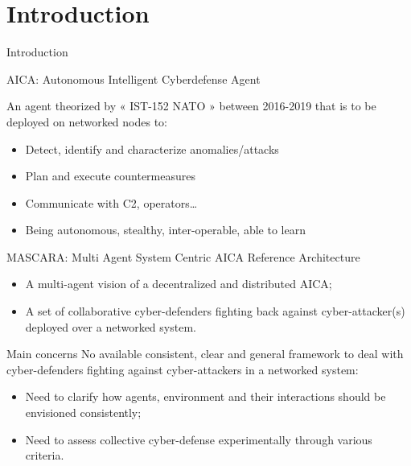 \AtBeginSection[]{
	\begin{frame}
		\frametitle{}
		\tableofcontents[currentsection]
	\end{frame}
}


	\section{Introduction}
	\begin{frame}[allowframebreaks]{Introduction}

	   \begin{block}{AICA: Autonomous Intelligent Cyberdefense Agent \cite{theron_autonomous_2021}}

            An agent theorized by « IST-152 NATO » between 2016-2019 that is to be deployed on networked nodes to:
 
	       \begin{itemize}
                \item Detect, identify and characterize anomalies/attacks
                \item Plan and execute countermeasures
                \item Communicate with C2, operators\dots
                \item Being autonomous, stealthy, inter-operable, able to learn
		\end{itemize}

        \end{block}

        \begin{block}{MASCARA: Multi Agent System Centric AICA Reference Architecture \cite{theron_autonomous_2021}}
            \begin{itemize}
                \item A multi-agent vision of a decentralized and distributed AICA;
                \item A set of collaborative cyber-defenders fighting back against cyber-attacker(s) deployed over a networked system.
            \end{itemize}
        \end{block}

        \begin{alertblock}{Main concerns}
            No available consistent, clear and general framework to deal with cyber-defenders fighting against cyber-attackers in a networked system:
            \begin{itemize}
                \item Need to clarify how agents, environment and their interactions should be envisioned consistently;
                \item Need to assess collective cyber-defense experimentally through various criteria.
            \end{itemize}


\end{alertblock}
\end{frame}
